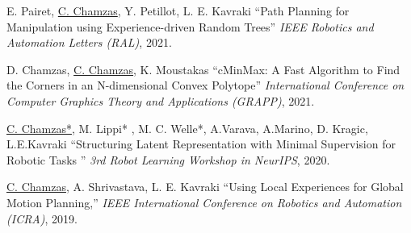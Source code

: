 \documentclass[letterpaper,11pt]{article}
\begin{document}
\begin{thebibliography}{9}
	E. Pairet, \underline{C. Chamzas}, Y. Petillot, L. E. Kavraki
	``Path Planning for Manipulation using Experience-driven Random Trees''
    \textit{IEEE Robotics and Automation Letters (RAL)}, 2021.
	
	D. Chamzas, \underline{C. Chamzas}, K. Moustakas
	``cMinMax: A Fast Algorithm to Find the Corners in an N-dimensional Convex Polytope''
    \textit{International Conference on Computer Graphics Theory and Applications (GRAPP)}, 2021. 

	\underline{C. Chamzas*}, M. Lippi* , M. C. Welle*, A.Varava, A.Marino, D. Kragic, L.E.Kavraki
    ``Structuring Latent Representation with Minimal Supervision for Robotic Tasks ''
    \textit{3rd Robot Learning Workshop in NeurIPS}, 2020. 

	\underline{C. Chamzas}, A. Shrivastava, L. E. Kavraki
	``Using Local Experiences for Global Motion Planning,''
    \textit{IEEE International Conference on Robotics and Automation (ICRA)}, 2019.
   
	\end{thebibliography}
	\endgroup
\end{document}
